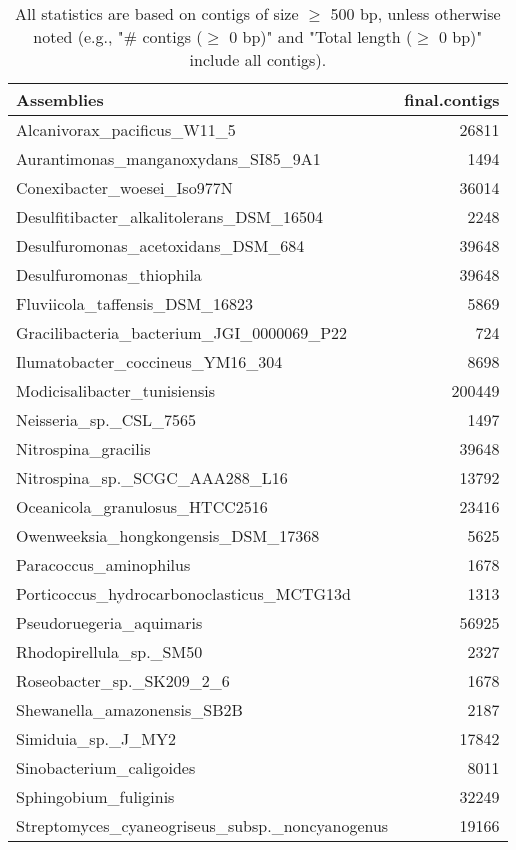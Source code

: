 \documentclass[12pt,a4paper]{article}
\begin{document}
\begin{table}[ht]
\begin{center}
\caption{All statistics are based on contigs of size $\geq$ 500 bp, unless otherwise noted (e.g., "\# contigs ($\geq$ 0 bp)" and "Total length ($\geq$ 0 bp)" include all contigs).}
\begin{tabular}{|l*{1}{|r}|}
\hline
Assemblies & final.contigs \\ \hline
Alcanivorax\_pacificus\_W11\_5 & 26811 \\ \hline
Aurantimonas\_manganoxydans\_SI85\_9A1 & 1494 \\ \hline
Conexibacter\_woesei\_Iso977N & 36014 \\ \hline
Desulfitibacter\_alkalitolerans\_DSM\_16504 & 2248 \\ \hline
Desulfuromonas\_acetoxidans\_DSM\_684 & 39648 \\ \hline
Desulfuromonas\_thiophila & 39648 \\ \hline
Fluviicola\_taffensis\_DSM\_16823 & 5869 \\ \hline
Gracilibacteria\_bacterium\_JGI\_0000069\_P22 & 724 \\ \hline
Ilumatobacter\_coccineus\_YM16\_304 & 8698 \\ \hline
Modicisalibacter\_tunisiensis & 200449 \\ \hline
Neisseria\_sp.\_CSL\_7565 & 1497 \\ \hline
Nitrospina\_gracilis & 39648 \\ \hline
Nitrospina\_sp.\_SCGC\_AAA288\_L16 & 13792 \\ \hline
Oceanicola\_granulosus\_HTCC2516 & 23416 \\ \hline
Owenweeksia\_hongkongensis\_DSM\_17368 & 5625 \\ \hline
Paracoccus\_aminophilus & 1678 \\ \hline
Porticoccus\_hydrocarbonoclasticus\_MCTG13d & 1313 \\ \hline
Pseudoruegeria\_aquimaris & 56925 \\ \hline
Rhodopirellula\_sp.\_SM50 & 2327 \\ \hline
Roseobacter\_sp.\_SK209\_2\_6 & 1678 \\ \hline
Shewanella\_amazonensis\_SB2B & 2187 \\ \hline
Simiduia\_sp.\_J\_MY2 & 17842 \\ \hline
Sinobacterium\_caligoides & 8011 \\ \hline
Sphingobium\_fuliginis & 32249 \\ \hline
Streptomyces\_cyaneogriseus\_subsp.\_noncyanogenus & 19166 \\ \hline

\end{tabular}
\end{center}
\end{table}
\end{document}
